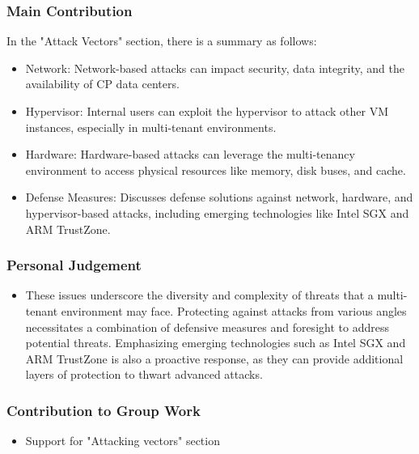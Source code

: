 \documentclass[12pt, twoside]{article}
\begin{document}
\subsubsection{Main Contribution}
In the "Attack Vectors" section, there is a summary as follows:
\begin{itemize}
\item Network: Network-based attacks can impact security, data integrity, and the availability of CP data centers.
\item Hypervisor: Internal users can exploit the hypervisor to attack other VM instances, especially in multi-tenant environments.
\item Hardware: Hardware-based attacks can leverage the multi-tenancy environment to access physical resources like memory, disk buses, and cache.
\item Defense Measures: Discusses defense solutions against network, hardware, and hypervisor-based attacks, including emerging technologies like Intel SGX and ARM TrustZone.
\end{itemize}

\subsubsection{Personal Judgement}
\begin{itemize}
\item These issues underscore the diversity and complexity of threats that a multi-tenant environment may face. Protecting against attacks from various angles necessitates a combination of defensive measures and foresight to address potential threats. Emphasizing emerging technologies such as Intel SGX and ARM TrustZone is also a proactive response, as they can provide additional layers of protection to thwart advanced attacks.
\end{itemize}

\subsubsection{Contribution to Group Work}
\begin{itemize}
\item Support for "Attacking vectors" section
\end{itemize}
\newpage
\renewcommand{\refname}{References}


\end{document}
